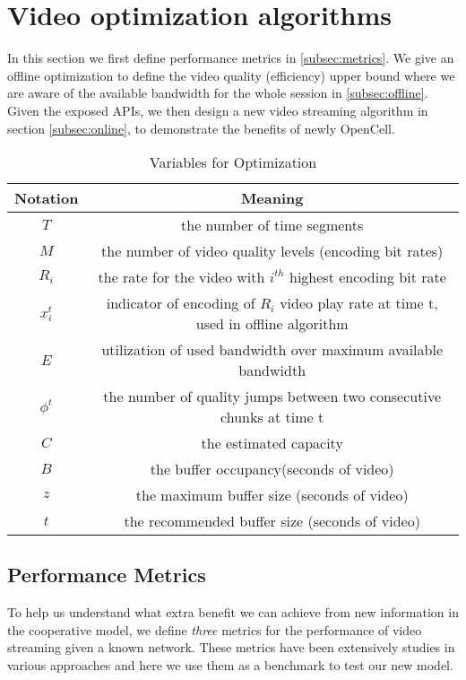 \section{Video optimization algorithms}\label{sec:optimization}
In this section we first define performance metrics in \autoref{subsec:metrics}. We give an offline optimization to define the video quality (efficiency) upper bound where we are aware of the available bandwidth for the whole session in \autoref{subsec:offline}.  Given the exposed APIs, we then design a new video streaming algorithm in section \ref{subsec:online},  to demonstrate the benefits of newly OpenCell.
\begin{table*}
\begin{tabular} {|c |c |}
\hline
Notation&Meaning\\ \hline
$T$ &the number of time segments\\ \hline
$M$ &the number of video quality levels (encoding bit rates)\\ \hline
$R_i$& the rate for the video with $i^{th}$ highest encoding bit rate\\ \hline
$x_i^t$&indicator of encoding of $R_i$ video play rate at time t, used in offline algorithm \\ \hline
$E$& utilization of used bandwidth over maximum available bandwidth \\ \hline
$\phi^t$ &the number of quality jumps between two consecutive chunks at time t\\ \hline
$C $ &the estimated capacity\\ \hline
$B $ &the buffer occupancy(seconds of video) \\ \hline
$z $ &the maximum buffer size (seconds of video) \\ \hline
$t $ &the recommended buffer size (seconds of video) \\ \hline
\end{tabular}
\centering
\caption{Variables for Optimization}
\end{table*}


\subsection{Performance Metrics}\label{subsec:metrics}
To help us understand what extra benefit we can achieve from new information in the cooperative model, we define \emph{three} metrics for the performance of video streaming given a known network. These metrics have been extensively studies in various approaches and here we use them as a benchmark to test our new model\cite{Qava, Avis,VideoMeasurement, Festive}.

